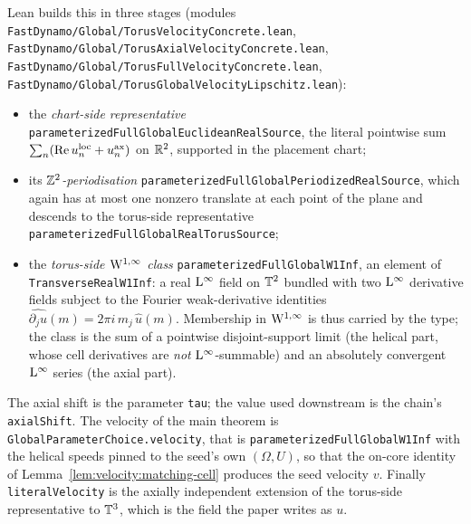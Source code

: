 Lean builds this in three stages (modules
\texttt{FastDynamo/Global/TorusVelocityConcrete.lean},
\texttt{FastDynamo/Global/TorusAxialVelocityConcrete.lean},
\texttt{FastDynamo/Global/TorusFullVelocityConcrete.lean},
\texttt{FastDynamo/Global/TorusGlobalVelocityLipschitz.lean}):
\begin{itemize}
  \item the \emph{chart-side representative}
    \texttt{parameterizedFullGlobalEuclideanRealSource}, the literal pointwise sum
    $\sum_n(\operatorname{Re} u_n^\mathrm{loc}+u_n^\mathrm{ax}) $ on $\mathbb{R}^2 $, supported in the placement
    chart;
  \item its \emph{$\mathbb{Z}^2 $-periodisation}
    \texttt{parameterizedFullGlobalPeriodizedRealSource}, which again has at most one
    nonzero translate at each point of the plane and descends to the torus-side
    representative \texttt{parameterizedFullGlobalRealTorusSource};
  \item the \emph{torus-side $\mathrm{W}^{1,\infty} $ class} \texttt{parameterizedFullGlobalW1Inf},
    an element of \texttt{TransverseRealW1Inf}: a real $\mathrm{L}^\infty $ field on $\mathbb{T}^2 $
    bundled with two $\mathrm{L}^\infty $ derivative fields subject to the Fourier
    weak-derivative identities
    $\widehat{\partial_ju}(m)=2\pi i\,m_j\,\widehat u(m) $.  Membership in
    $\mathrm{W}^{1,\infty} $ is thus carried by the type; the class is the sum of a pointwise
    disjoint-support limit (the helical part, whose cell derivatives are \emph{not}
    $\mathrm{L}^\infty $-summable) and an absolutely convergent $\mathrm{L}^\infty $ series
    (the axial part).
\end{itemize}
The axial shift is the parameter \texttt{tau}; the value used downstream is the chain's
\texttt{axialShift}.  The velocity of the main theorem is
\texttt{GlobalParameterChoice.velocity}, that is
\texttt{parameterizedFullGlobalW1Inf} with the helical
speeds pinned to the seed's own $(\Omega,U) $, so that the on-core identity of
Lemma~\ref{lem:velocity:matching-cell} produces the seed velocity $v $.  Finally
\texttt{literalVelocity} is the axially independent extension of the torus-side
representative to $\mathbb{T}^3 $, which is the field the paper writes as $u $.

